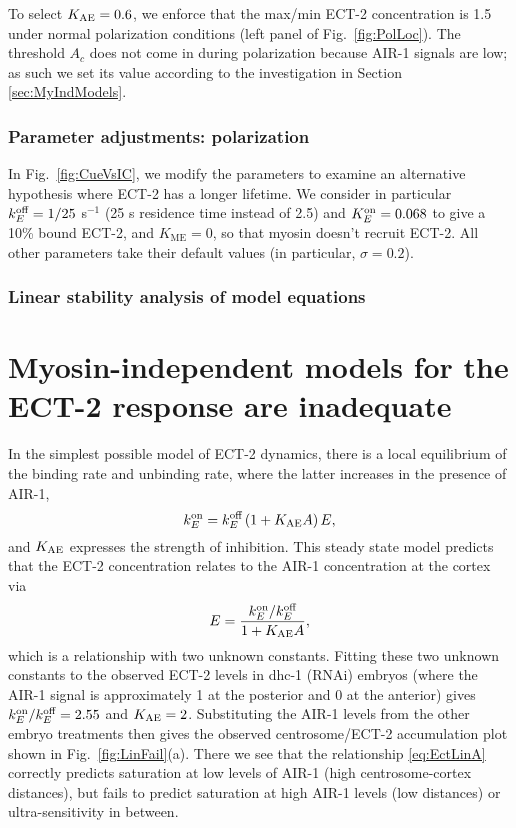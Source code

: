 \documentclass[11pt]{article}
\begin{document}
\begin{appendix}
To select $K_\text{AE}=0.6$, we enforce that the max/min ECT-2 concentration is 1.5 under normal polarization conditions (left panel of Fig.\ \ref{fig:PolLoc}). The threshold $A_c$ does not come in during polarization because AIR-1 signals are low; as such we set its value according to the investigation in Section \ref{sec:MyIndModels}. 

\subsubsection{Parameter adjustments: polarization \label{sec:EctTurnP}}
In Fig.\ \ref{fig:CueVsIC}, we modify the parameters to examine an alternative hypothesis where ECT-2 has a longer lifetime. We consider in particular $k^\text{off}_E=1/25$ s$^{-1}$ (25 s residence time instead of 2.5) and $K^\text{on}_E=0.068$ to give a 10\% bound ECT-2, and $K_\text{ME}=0$, so that myosin doesn't recruit ECT-2. All other parameters take their default values (in particular, $\sigma=0.2$). 

\subsubsection{Linear stability analysis of model equations}




\section{Myosin-independent models for the ECT-2 response are inadequate \label{sec:MyIndModels}}
In the simplest possible model of ECT-2 dynamics, there is a local equilibrium of the binding rate and unbinding rate, where the latter increases in the presence of AIR-1,
\begin{equation}
\label{eq:EctA}
 k^\text{on}_E = k^\text{off}_E \left(1+K_\text{AE} A \right)E,
\end{equation}
and $K_\text{AE}$ expresses the strength of inhibition. This steady state model predicts that the ECT-2 concentration relates to the AIR-1 concentration at the cortex via
\begin{equation}
\label{eq:EctLinA}
E = \frac{k^\text{on}_E/ k^\text{off}_E}{ 1+K_\text{AE} A},
\end{equation}
which is a relationship with two unknown constants. Fitting these two unknown constants to the observed ECT-2 levels in dhc-1 (RNAi) embryos (where the AIR-1 signal is approximately 1 at the posterior and 0 at the anterior) gives $k^\text{on}_E/ k^\text{off}_E=2.55$ and $K_\text{AE}=2$. Substituting the AIR-1 levels from the other embryo treatments then gives the observed centrosome/ECT-2 accumulation plot shown in Fig.\ \ref{fig:LinFail}(a). There we see that the relationship \eqref{eq:EctLinA} correctly predicts saturation at low levels of AIR-1 (high centrosome-cortex distances), but fails to predict saturation at high AIR-1 levels (low distances) or ultra-sensitivity in between. 


\end{appendix}
\end{document}
